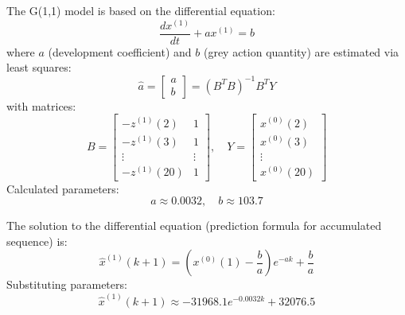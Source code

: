 \documentclass{mcmthesis}
\begin{document}
The G(1,1) model is based on the differential equation:
\begin{equation}
\frac{dx^{(1)}}{dt} + ax^{(1)} = b
\label{eq:differential}
\end{equation}
where \( a \) (development coefficient) and \( b \) (grey action quantity) are estimated via least squares:
\begin{equation}
\hat{a} = \begin{bmatrix} a \\ b \end{bmatrix} = (B^T B)^{-1} B^T Y
\label{eq:parameter_est}
\end{equation}
with matrices:
\begin{equation}
B = \begin{bmatrix} -z^{(1)}(2) & 1 \\ -z^{(1)}(3) & 1 \\ \vdots & \vdots \\ -z^{(1)}(20) & 1 \end{bmatrix}, \quad Y = \begin{bmatrix} x^{(0)}(2) \\ x^{(0)}(3) \\ \vdots \\ x^{(0)}(20) \end{bmatrix}
\label{eq:matrices}
\end{equation}
Calculated parameters:
\begin{equation}
a \approx 0.0032, \quad b \approx 103.7
\label{eq:params}
\end{equation}

The solution to the differential equation (prediction formula for accumulated sequence) is:
\begin{equation}
\hat{x}^{(1)}(k+1) = \left( x^{(0)}(1) - \frac{b}{a} \right) e^{-ak} + \frac{b}{a}
\label{eq:response}
\end{equation}
Substituting parameters:
\begin{equation}
\hat{x}^{(1)}(k+1) \approx -31968.1 e^{-0.0032k} + 32076.5
\label{eq:response_param}
\end{equation}
\end{document}
